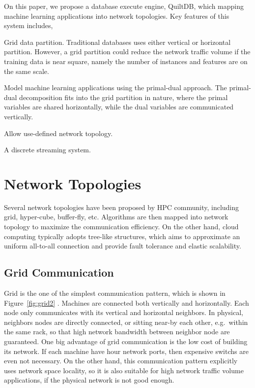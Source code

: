 \documentclass[11pt, twocolumn]{article}
\begin{document}
On this paper, we propose a database execute engine, QuiltDB, which mapping
machine learning applications into network topologies. Key features of this
system includes,

\begin{itemize*}
\item Grid data partition. Traditional databases uses either vertical or
  horizontal partition. However, a grid partition could reduce the network
  traffic volume if the training data is near square, namely the number of
  instances and features are on the same scale.
\item Model machine learning applications using the
  primal-dual approach. The primal-dual decomposition fits into the grid
  partition in nature, where the primal variables are shared horizontally, while
  the dual variables are communicated vertically.
\item Allow use-defined network topology.
\item A discrete streaming system.
\end{itemize*}

\section{Network Topologies}
\label{sec:network-topologies}

Several network topologies have been proposed by HPC community, including grid,
hyper-cube, buffer-fly, etc. Algorithms are then mapped into network topology to
maximize the communication efficiency. On the other hand, cloud computing
typically adopts
tree-like structures, which aims to approximate an uniform all-to-all connection
and provide fault tolerance and elastic scalability.

\subsection{Grid Communication}

Grid is the one of the simplest communication pattern, which is shown in
Figure~\ref{fig:grid2} \cite{DeeBlyGilKesetal04, FosZhaRaiLu08}. Machines are connected both vertically and
horizontally. Each node only communicates with its vertical and horizontal
neighbors. In physical, neighbors nodes are directly connected, or sitting
near-by each other, e.g.~within the same rack,  so that high network bandwidth
between neighbor node are guaranteed. One big advantage of grid communication is
the low cost of building its network. If each machine have hour network ports,
then expensive switchs are even not necessary. On the other hand, this
communication pattern explicitly uses network space locality, so it is also
suitable for high network traffic volume applications, if the physical network
is not good enough.
\end{document}
